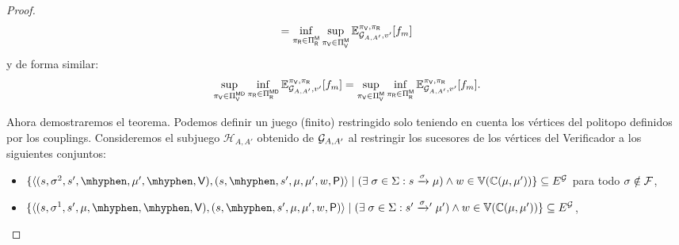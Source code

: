 \begin{proof}
\[    =  \inf_{\pi_{\mathsf{R}} \in \Pi_{\mathsf{R}}^{\mathsf{M}}}  \sup_{\pi_{\mathsf{V}} \in \Pi_{\mathsf{V}}^{\mathsf{M}}} \mathbb{E}_{\mathcal{G}_{A,A'},v'}^{\pi_{\mathsf{V}},\pi_{\mathsf{R}}}[f_{m}]
\]
y de forma similar:
\[
    \sup_{\pi_{\mathsf{V}} \in \Pi_{\mathsf{V}}^{\mathsf{M}\mathsf{D}}}  \inf_{\pi_{\mathsf{R}} \in \Pi_{\mathsf{R}}^{\mathsf{M}\mathsf{D}}} \mathbb{E}_{\mathcal{G}_{A,A'},v'}^{\pi_{\mathsf{V}},\pi_{\mathsf{R}}}[f_{m}] 
    =  \sup_{\pi_{\mathsf{V}} \in \Pi_{\mathsf{V}}^{\mathsf{M}}}  \inf_{\pi_{\mathsf{R}} \in \Pi_{\mathsf{R}}^{\mathsf{M}}} \mathbb{E}_{\mathcal{G}_{A,A'},v'}^{\pi_{\mathsf{V}},\pi_{\mathsf{R}}}[f_{m}].
\]

    Ahora demostraremos el teorema.  Podemos definir un juego (finito) restringido solo teniendo en cuenta los vértices del politopo definidos por los couplings.  Consideremos el subjuego $\mathcal{H}_{A,A'}$ obtenido de $\mathcal{G}_{A,A'}$ al restringir los sucesores de los vértices del Verificador a los siguientes conjuntos:
\begin{itemize}
	\item $\{ \langle (s, \sigma^2, s', \mhyphen, \mu', \mhyphen, \Verifier), (s, \mhyphen, s', \mu, \mu', w, \Probabilistic) \rangle \mid (\exists\;\sigma \in \Sigma: s \xrightarrow{\sigma} \mu) \wedge   w \in \vertices{\couplings{\mu}{\mu'}}\} \subseteq E^\StochG$ para todo $\sigma \notin \mathcal{F}$,

 	 \item $\{ \langle (s, \sigma^1, s', \mu, \mhyphen, \mhyphen, \Verifier),(s, \mhyphen, s', \mu, \mu', w, \Probabilistic) \rangle \mid (\exists\;\sigma \in \Sigma: s' \xrightarrowprime{\sigma} \mu' ) \wedge  w \in \vertices{\couplings{\mu}{\mu'}} \} \subseteq E^\StochG$,
	 

\end{itemize}
\end{proof}

